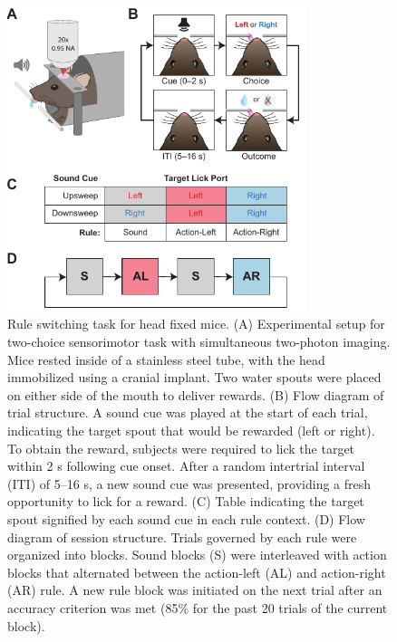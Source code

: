 \begin{figure}[htbp]

\begin{center}
\includegraphics[width=8.7cm]{Figures/Chapter4/Fig1}
\end{center}

\caption[Rule switching task for head-fixed mice]
{Rule switching task for head fixed mice. (A) Experimental setup for two-choice sensorimotor task with simultaneous two-photon imaging. Mice rested inside of a stainless steel tube, with the head immobilized using a cranial implant. Two water spouts were placed on either side of the mouth to deliver rewards. (B) Flow diagram of trial structure. A sound cue was played at the start of each trial, indicating the target spout that would be rewarded (left or right). To obtain the reward, subjects were required to lick the target within 2 s following cue onset. After a random intertrial interval (ITI) of 5--16 s, a new sound cue was presented, providing a fresh opportunity to lick for a reward. (C) Table indicating the target spout signified by each sound cue in each rule context. (D) Flow diagram of session structure. Trials governed by each rule were organized into blocks. Sound blocks (S) were interleaved with action blocks that alternated between the action-left (AL) and action-right (AR) rule. A new rule block was initiated on the next trial after an accuracy criterion was met (85\% for the past 20 trials of the current block).}

\label{fig:Fig1}
\end{figure}